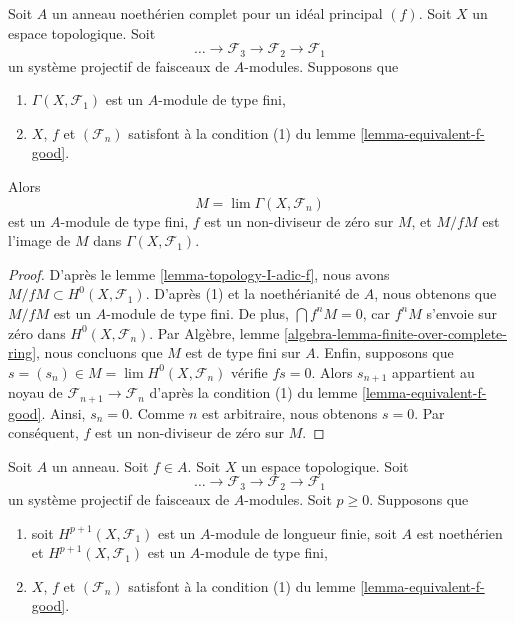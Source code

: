 {\begin{lemma}
Soit $A$ un anneau noethérien complet pour un idéal principal $(f)$. Soit $X$ un espace topologique. Soit
$$
\ldots \to \mathcal{F}_3 \to \mathcal{F}_2 \to \mathcal{F}_1
$$
un système projectif de faisceaux de $A$-modules. Supposons que

\begin{enumerate}

\item $\Gamma(X, \mathcal{F}_1)$ est un $A$-module de type fini,
\item $X$, $f$ et $(\mathcal{F}_n)$ satisfont à la condition (1) du lemme \ref{lemma-equivalent-f-good}.

\end{enumerate}

Alors
$$
M = \lim \Gamma(X, \mathcal{F}_n)
$$
est un $A$-module de type fini, $f$ est un non-diviseur de zéro sur $M$, et
$M/fM$ est l'image de $M$ dans $\Gamma(X, \mathcal{F}_1)$.

\end{lemma}

\begin{proof}

D'après le lemme \ref{lemma-topology-I-adic-f}, nous avons
$M/fM \subset H^0(X, \mathcal{F}_1)$. D'après (1) et la noethérianité de $A$, nous obtenons que $M/fM$ est un $A$-module de type fini. De plus, $\bigcap f^nM = 0$, car $f^nM$ s'envoie sur zéro dans
$H^0(X, \mathcal{F}_n)$. Par Algèbre, lemme \ref{algebra-lemma-finite-over-complete-ring},
nous concluons que $M$ est de type fini sur $A$. Enfin, supposons que $s = (s_n) \in M = \lim H^0(X, \mathcal{F}_n)$
vérifie $fs = 0$. Alors $s_{n + 1}$ appartient au noyau de
$\mathcal{F}_{n + 1} \to \mathcal{F}_n$ d'après la condition (1) du lemme \ref{lemma-equivalent-f-good}. Ainsi, $s_n = 0$. Comme $n$ est arbitraire, nous obtenons $s = 0$. Par conséquent, $f$ est un non-diviseur de zéro sur $M$.

\end{proof}

\begin{lemma}

\label{lemma-ML}

Soit $A$ un anneau. Soit $f \in A$. Soit $X$ un espace topologique. Soit
$$
\ldots \to \mathcal{F}_3 \to \mathcal{F}_2 \to \mathcal{F}_1
$$
un système projectif de faisceaux de $A$-modules. Soit $p \geq 0$. Supposons que

\begin{enumerate}

\item soit $H^{p + 1}(X, \mathcal{F}_1)$ est un $A$-module de longueur finie, soit $A$ est noethérien et $H^{p + 1}(X, \mathcal{F}_1)$ est un $A$-module de type fini,
\item $X$, $f$ et $(\mathcal{F}_n)$ satisfont à la condition (1) du lemme \ref{lemma-equivalent-f-good}.


\end{enumerate}
\end{lemma}}
